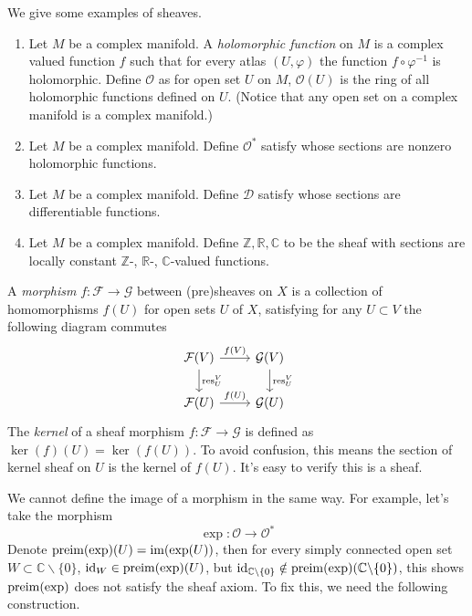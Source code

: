 \begin{eg}
    We give some examples of sheaves.
    \begin{enumerate}
        \item Let $M$ be a complex manifold.
        A \emph{holomorphic function} on $M$ is a complex valued function $f$ such that for every atlas $(U,\varphi)$ the function $f\circ\varphi^{-1}$ is holomorphic.
        Define $\mathcal{O}$ as for open set $U$ on $M$, $\mathcal{O}(U)$ is the ring of all holomorphic functions defined on $U$.
        (Notice that any open set on a complex manifold is a complex manifold.)
        \item Let $M$ be a complex manifold.
        Define $\mathcal{O}^*$ satisfy whose sections are nonzero holomorphic functions.
        \item Let $M$ be a complex manifold.
        Define $\mathcal{D}$ satisfy whose sections are differentiable functions.
        \item Let $M$ be a complex manifold.
        Define $\mathbb{Z},\mathbb{R},\mathbb{C}$ to be the sheaf with sections are locally constant $\mathbb{Z}$-, $\mathbb{R}$-, $\mathbb{C}$-valued functions.
    \end{enumerate}
\end{eg}

\begin{defn}
    A \emph{morphism} $f:\mathcal{F}\to\mathcal{G}$ between (pre)sheaves on $X$ is a collection of homomorphisms $f(U)$ for open sets $U$ of $X$, satisfying for any $U\subset V$ the following diagram commutes
    \[\begin{tikzcd}
        \mathcal{F}(V)\ar[r,"f(V)"]\ar[d,"\res^V_U"] & \mathcal{G}(V)\ar[d,"\res^V_U"]\\
        \mathcal{F}(U)\ar[r,"f(U)"] & \mathcal{G}(U)
    \end{tikzcd}\]
    The \emph{kernel} of a sheaf morphism $f:\mathcal{F}\to\mathcal{G}$ is defined as $\ker(f)(U)=\ker(f(U))$.
    To avoid confusion, this means the section of kernel sheaf on $U$ is the kernel of $f(U)$.
    It's easy to verify this is a sheaf.
\end{defn}

\begin{eg}
    We cannot define the image of a morphism in the same way.
    For example, let's take the morphism
    \[\exp:\mathcal{O}\to\mathcal{O}^*\]
    Denote $\operatorname{preim}(\exp)(U)=\operatorname{im}(\exp(U))$, then for every simply connected open set $W\subset\mathbb{C}\backslash\{0\}$, $\mathrm{id}_W\in\operatorname{preim}(\exp)(U)$, but $\mathrm{id}_{\mathbb{C}\backslash\{0\}}\notin\operatorname{preim}(\exp)(\mathbb{C}\backslash\{0\})$, this shows $\operatorname{preim}(\exp)$ does not satisfy the sheaf axiom.
    To fix this, we need the following construction.
\end{eg}

